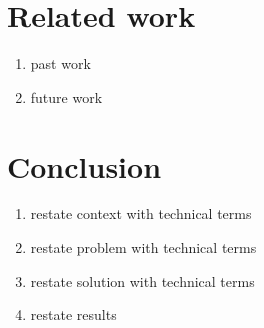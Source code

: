 \documentclass[manuscript]{acmart}
\begin{document}
\section{Related work}
\begin{enumerate}
  \item past work 
  \item future work 
\end{enumerate}

\section{Conclusion}
\begin{enumerate}
  \item restate context with technical terms 
  \item restate problem with technical terms 
  \item restate solution with technical terms 
  \item restate results 
\end{enumerate}


\end{document}

